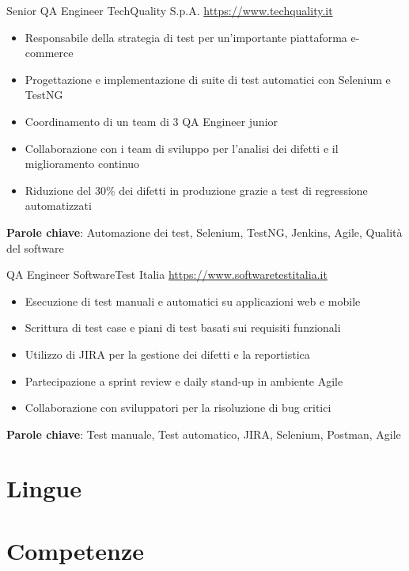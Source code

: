 \documentclass[a4paper, serif, 10pt]{moderncv}
\begin{document}
        {Senior QA Engineer}
        {TechQuality S.p.A.}
        {\url{https://www.techquality.it}}
        {}
        {\begin{itemize}
\item Responsabile della strategia di test per un'importante piattaforma e-commerce
\item Progettazione e implementazione di suite di test automatici con Selenium e TestNG
\item Coordinamento di un team di 3 QA Engineer junior
\item Collaborazione con i team di sviluppo per l'analisi dei difetti e il miglioramento continuo
\item Riduzione del 30\% dei difetti in produzione grazie a test di regressione automatizzati
\end{itemize}
\textbf{Parole chiave}: Automazione dei test, Selenium, TestNG, Jenkins, Agile, Qualità del software}

        {QA Engineer}
        {SoftwareTest Italia}
        {\url{https://www.softwaretestitalia.it}}
        {}
        {\begin{itemize}
\item Esecuzione di test manuali e automatici su applicazioni web e mobile
\item Scrittura di test case e piani di test basati sui requisiti funzionali
\item Utilizzo di JIRA per la gestione dei difetti e la reportistica
\item Partecipazione a sprint review e daily stand-up in ambiente Agile
\item Collaborazione con sviluppatori per la risoluzione di bug critici
\end{itemize}
\textbf{Parole chiave}: Test manuale, Test automatico, JIRA, Selenium, Postman, Agile}
\section{Lingue}

\section{Competenze}

\end{document}
